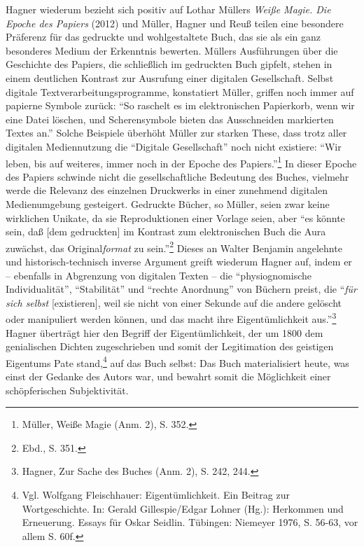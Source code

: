 \documentclass[a4paper,
fontsize=11pt,
oneside,
numbers=noperiodatend,
parskip=half-,
bibliography=totoc,
final
]{scrartcl}
\begin{document}
Hagner wiederum bezieht sich positiv auf Lothar Müllers \emph{Weiße
Magie. Die Epoche des Papiers} (2012) und Müller, Hagner und Reuß teilen
eine besondere Präferenz für das gedruckte und wohlgestaltete Buch, das
sie als ein ganz besonderes Medium der Erkenntnis bewerten. Müllers
Ausführungen über die Geschichte des Papiers, die schließlich im
gedruckten Buch gipfelt, stehen in einem deutlichen Kontrast zur
Ausrufung einer digitalen Gesellschaft. Selbst digitale
Textverarbeitungsprogramme, konstatiert Müller, griffen noch immer auf
papierne Symbole zurück: \enquote{So raschelt es im elektronischen
Papierkorb, wenn wir eine Datei löschen, und Scherensymbole bieten das
Ausschneiden markierten Textes an.} Solche Beispiele überhöht Müller zur
starken These, dass trotz aller digitalen Mediennutzung die
\enquote{Digitale Gesellschaft} noch nicht existiere: \enquote{Wir
leben, bis auf weiteres, immer noch in der Epoche des
Papiers.}\footnote{Müller, Weiße Magie (Anm. 2), S. 352.} In dieser
Epoche des Papiers schwinde nicht die gesellschaftliche Bedeutung des
Buches, vielmehr werde die Relevanz des einzelnen Druckwerks in einer
zunehmend digitalen Medienumgebung gesteigert. Gedruckte Bücher, so
Müller, seien zwar keine wirklichen Unikate, da sie Reproduktionen einer
Vorlage seien, aber \enquote{es könnte sein, daß {[}dem gedruckten{]} im
Kontrast zum elektronischen Buch die Aura zuwächst, das
Original\emph{format} zu sein.}\footnote{Ebd., S. 351.} Dieses an Walter
Benjamin angelehnte und historisch-technisch inverse Argument greift
wiederum Hagner auf, indem er -- ebenfalls in Abgrenzung von digitalen
Texten -- die \enquote{physiognomische Individualität},
\enquote{Stabilität} und \enquote{rechte Anordnung} von Büchern preist,
die \enquote{\emph{für sich selbst} {[}existieren{]}, weil sie nicht von
einer Sekunde auf die andere gelöscht oder manipuliert werden können,
und das macht ihre Eigentümlichkeit aus.}\footnote{Hagner, Zur Sache des
  Buches (Anm. 2), S. 242, 244.} Hagner überträgt hier den Begriff der
Eigentümlichkeit, der um 1800 dem genialischen Dichten zugeschrieben und
somit der Legitimation des geistigen Eigentums Pate stand,\footnote{Vgl.
  Wolfgang Fleischhauer: Eigentümlichkeit. Ein Beitrag zur
  Wortgeschichte. In: Gerald Gillespie/Edgar Lohner (Hg.): Herkommen und
  Erneuerung. Essays für Oskar Seidlin. Tübingen: Niemeyer 1976, S.
  56-63, vor allem S. 60f.} auf das Buch selbst: Das Buch materialisiert
heute, was einst der Gedanke des Autors war, und bewahrt somit die
Möglichkeit einer schöpferischen Subjektivität.
\end{document}
